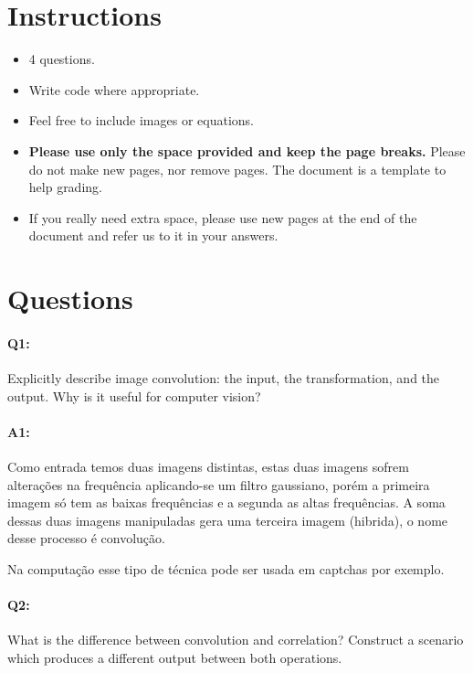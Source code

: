 \section*{Instructions}
\begin{itemize}
  \item 4 questions.
  \item Write code where appropriate.
  \item Feel free to include images or equations.%
  \item \textbf{Please use only the space provided and keep the page breaks.} Please do not make new pages, nor remove pages. The document is a template to help grading.
  \item If you really need extra space, please use new pages at the end of the document and refer us to it in your answers.
\end{itemize}

\section*{Questions}

\paragraph{Q1:} Explicitly describe image convolution: the input, the transformation, and the output. Why is it useful for computer vision?

\paragraph{A1:} Como entrada temos duas imagens distintas, estas duas imagens sofrem alterações na frequência aplicando-se um filtro gaussiano, porém a primeira imagem só tem as baixas frequências e a segunda as altas frequências. A soma dessas duas imagens manipuladas gera uma terceira imagem (hibrida), o nome desse processo é convolução.

Na computação esse tipo de técnica pode ser usada em captchas por exemplo.






\pagebreak
\paragraph{Q2:} What is the difference between convolution and correlation? Construct a scenario which produces a different output between both operations.

